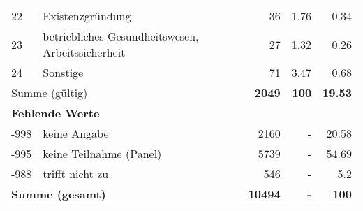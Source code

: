 \begin{longtable}{lXrrr}
        22 & \multicolumn{1}{X}{Existenzgründung} & %
          \num{36} &
          \num[round-mode=places,round-precision=2]{1.76} &
          \num[round-mode=places,round-precision=2]{0.34} \\

        23 & \multicolumn{1}{X}{betriebliches Gesundheitswesen, Arbeitssicherheit} & %
          \num{27} &
          \num[round-mode=places,round-precision=2]{1.32} &
          \num[round-mode=places,round-precision=2]{0.26} \\

        24 & \multicolumn{1}{X}{Sonstige} & %
          \num{71} &
          \num[round-mode=places,round-precision=2]{3.47} &
          \num[round-mode=places,round-precision=2]{0.68} \\

     \midrule
     \multicolumn{2}{l}{Summe (gültig)} &
       \textbf{\num{2049}} &
     \textbf{\num{100}} &
       \textbf{\num[round-mode=places,round-precision=2]{19.53}} \\
     \multicolumn{5}{l}{\textbf{Fehlende Werte}}\\
       -998 &
       keine Angabe &
         \num{2160} &
        - &
         \num[round-mode=places,round-precision=2]{20.58} \\
       -995 &
       keine Teilnahme (Panel) &
         \num{5739} &
        - &
         \num[round-mode=places,round-precision=2]{54.69} \\
       -988 &
       trifft nicht zu &
         \num{546} &
        - &
         \num[round-mode=places,round-precision=2]{5.2} \\
     \midrule
     \multicolumn{2}{l}{\textbf{Summe (gesamt)}} &
          \textbf{\num{10494}} &
        \textbf{-} &
        \textbf{\num{100}} \\
     \bottomrule
     \end{longtable}
     
